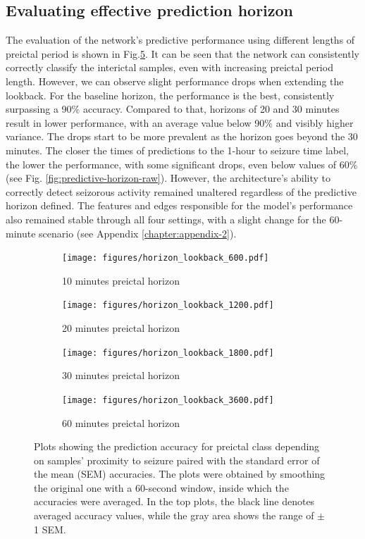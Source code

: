 \documentclass[a4paper,fleqn]{cas-sc}
\begin{document}
\subsection{Evaluating effective prediction horizon}

The evaluation of the network's predictive performance using different lengths of preictal period is shown in Fig.\ref{fig:predictive-horizon}. 
It can be seen that the network can consistently correctly classify the interictal samples, even with increasing preictal period length. However, we can observe slight performance drops when extending the lookback. For the baseline horizon, the performance is the best, consistently surpassing a 90\% accuracy. Compared to that, horizons of 20 and 30 minutes result in lower performance, with an average value below 90\% and visibly higher variance. The drops start to be more prevalent as the horizon goes beyond the 30 minutes. The closer the times of predictions to the 1-hour to seizure time label, the lower the performance, with some significant drops, even below values of 60\% (see Fig. \ref{fig:predictive-horizon-raw}). However, the architecture's ability to correctly detect seizorous activity remained unaltered regardless of the predictive horizon defined. The features and edges responsible for the model's performance also remained stable through all four settings, with a slight change for the 60-minute scenario (see Appendix \ref{chapter:appendix-2}). %

\begin{figure}[h!]
	\centering
	\begin{subfigure}{0.48\linewidth}
		\texttt{[image: figures/horizon\_lookback\_600.pdf]}
		\caption{10 minutes preictal horizon}
		\label{fig:subfigA}
	\end{subfigure}
	\begin{subfigure}{0.48\linewidth}
		\texttt{[image: figures/horizon\_lookback\_1200.pdf]}
		\caption{20 minutes preictal horizon}
		\label{fig:subfigB}
	\end{subfigure}
        \vfill
	\begin{subfigure}{0.48\linewidth}
	        \texttt{[image: figures/horizon\_lookback\_1800.pdf]}
	        \caption{30 minutes preictal horizon}
	        \label{fig:subfigC}
         \end{subfigure}
         \begin{subfigure}{0.48\linewidth}
	        \texttt{[image: figures/horizon\_lookback\_3600.pdf]}
	        \caption{60 minutes preictal horizon}
	        \label{fig:subfigD}
         \end{subfigure}
	\caption{Plots showing the prediction accuracy for preictal class depending on samples' proximity to seizure paired with the standard error of the mean (SEM) accuracies. The plots were obtained by smoothing the original one with a 60-second window, inside which the accuracies were averaged. In the top plots, the black line denotes averaged accuracy values, while the gray area shows the range of $\pm$ 1 SEM. }
	\label{fig:predictive-horizon}
\end{figure}
\end{document}
